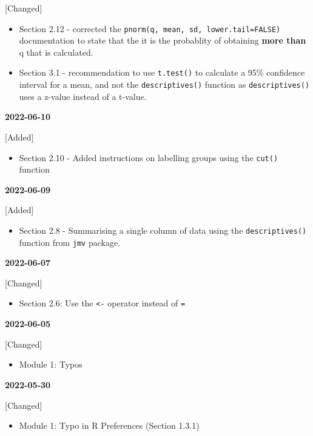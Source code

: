 \documentclass[
]{memoir}
\providecommand{\tightlist}{%
  \setlength{\itemsep}{0pt}\setlength{\parskip}{0pt}}
\begin{document}
{[}Changed{]}

\begin{itemize}
\item
  Section 2.12 - corrected the \texttt{pnorm(q,\ mean,\ sd,\ lower.tail=FALSE)} documentation to state that the it is the probablity of obtaining \textbf{more than} q that is calculated.
\item
  Section 3.1 - recommendation to use \texttt{t.test()} to calculate a 95\% confidence interval for a mean, and not the \texttt{descriptives()} function as \texttt{descriptives()} uses a z-value instead of a t-value.
\end{itemize}

\textbf{2022-06-10}

{[}Added{]}

\begin{itemize}
\tightlist
\item
  Section 2.10 - Added instructions on labelling groups using the \texttt{cut()} function
\end{itemize}

\textbf{2022-06-09}

{[}Added{]}

\begin{itemize}
\tightlist
\item
  Section 2.8 - Summarising a single column of data using the \texttt{descriptives()} function from \texttt{jmv} package.
\end{itemize}

\textbf{2022-06-07}

{[}Changed{]}

\begin{itemize}
\tightlist
\item
  Section 2.6: Use the \texttt{\textless{}-} operator instead of \texttt{=}
\end{itemize}

\textbf{2022-06-05}

{[}Changed{]}

\begin{itemize}
\tightlist
\item
  Module 1: Typos
\end{itemize}

\textbf{2022-05-30}

{[}Changed{]}

\begin{itemize}
\tightlist
\item
  Module 1: Typo in R Preferences (Section 1.3.1)
\end{itemize}
\end{document}
